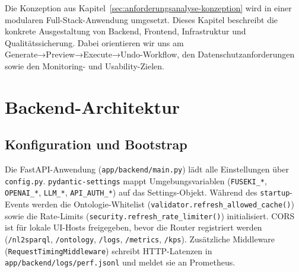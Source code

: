 Die Konzeption aus Kapitel~\ref{sec:anforderungsanalyse-konzeption} wird in einer modularen Full-Stack-Anwendung umgesetzt. Dieses Kapitel beschreibt die konkrete Ausgestaltung von Backend, Frontend, Infrastruktur und Qualitätssicherung. Dabei orientieren wir uns am Generate→Preview→Execute→Undo-Workflow, den Datenschutzanforderungen sowie den Monitoring- und Usability-Zielen.

\section{Backend-Architektur}

\subsection{Konfiguration und Bootstrap}
Die FastAPI-Anwendung (\texttt{app/backend/main.py}) lädt alle Einstellungen über \texttt{config.py}. \texttt{pydantic-settings} mappt Umgebungsvariablen (\texttt{FUSEKI\_*}, \texttt{OPENAI\_*}, \texttt{LLM\_*}, \texttt{API\_AUTH\_*}) auf das Settings-Objekt. Während des \texttt{startup}-Events werden die Ontologie-Whitelist (\texttt{validator.refresh\_allowed\_cache()}) sowie die Rate-Limits (\texttt{security.refresh\_rate\_limiter()}) initialisiert. CORS ist für lokale UI-Hosts freigegeben, bevor die Router registriert werden (\texttt{/nl2sparql}, \texttt{/ontology}, \texttt{/logs}, \texttt{/metrics}, \texttt{/kps}). Zusätzliche Middleware (\texttt{RequestTimingMiddleware}) schreibt HTTP-Latenzen in \texttt{app/backend/logs/perf.jsonl} und meldet sie an Prometheus.

